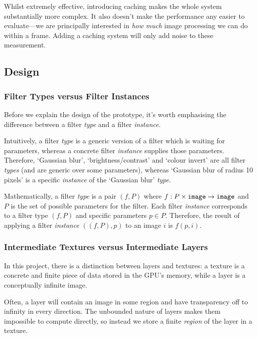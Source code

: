 \documentclass[12pt]{article}
\begin{document}
Whilst extremely effective, introducing caching makes the whole system substantially more complex.
It also doesn't make the performance any easier to evaluate---we are principally interested in
\emph{how much} image processing we can do within a frame.  Adding a caching system will only add
noise to these measurement.

\subsection{Design}

\subsubsection{Filter Types versus Filter Instances}

Before we explain the design of the prototype, it's worth emphasising the difference between a
filter \emph{type} and a filter \emph{instance}.

Intuitively, a filter \emph{type} is a generic version of a filter which is waiting for parameters,
whereas a concrete filter \emph{instance} supplies those parameters.  Therefore, `Gaussian blur',
`brightness/contrast' and `colour invert' are all filter \emph{types} (and are generic over some
parameters), whereas `Gaussian blur of radius 10 pixels' is a specific \emph{instance} of the
`Gaussian blur' \emph{type}.

Mathematically, a filter \emph{type} is a pair $(f, P)$ where $f: P \times \verb|image| \rightarrow
\verb|image|$ and $P$ is the set of possible parameters for the filter.  Each filter \emph{instance}
corresponds to a filter type $(f, P)$ and specific parameters $p \in P$.  Therefore, the result of
applying a filter \emph{instance} $((f, P), p)$ to an image $i$ is $f(p, i)$.

\subsubsection{Intermediate Textures versus Intermediate Layers}

In this project, there is a distinction between layers and textures: a texture is a concrete and
finite piece of data stored in the GPU's memory, while a layer is a conceptually infinite image.

Often, a layer will contain an image in some region and have transparency off to infinity in every
direction.  The unbounded nature of layers makes them impossible to compute directly, so instead we
store a finite \emph{region} of the layer in a texture.
\end{document}
